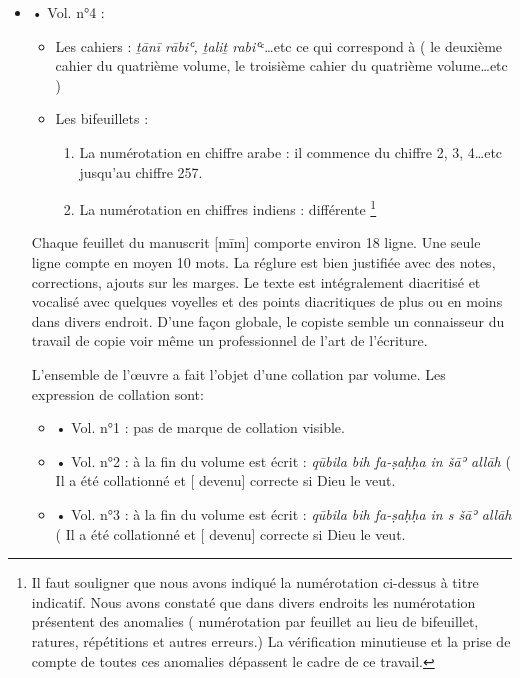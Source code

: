 \documentclass[a4paper,12pt]{report}
\begin{document}
\begin{itemize}
\begin{enumerate}
\begin{itemize}
\begin{itemize}
\begin{enumerate}
        \end{enumerate}
    
    \end{itemize}
    \item •	Vol. n°4 : 
    \begin{itemize}
        \item 	Les cahiers : \textit{ṯānī rābiʿ, ṯaliṯ rabiʿ}ᶜ…etc ce qui correspond à ( le deuxième cahier du quatrième volume, le troisième cahier du quatrième volume…etc ) 
        \item Les bifeuillets : 
         \begin{enumerate}
            \item La numérotation en chiffre arabe : il commence du chiffre 2, 3, 4…etc jusqu’au chiffre  257. 
            \item La numérotation en chiffres indiens : différente    \footnote{Il faut souligner que nous avons indiqué la numérotation ci-dessus à titre indicatif. Nous avons constaté que dans divers endroits les numérotation présentent des anomalies ( numérotation par feuillet au lieu de bifeuillet, ratures, répétitions et autres erreurs.) La vérification minutieuse et la prise de compte de toutes ces anomalies dépassent le cadre de ce travail.  }
     
        \end{enumerate}
    
    \end{itemize}
Chaque feuillet du manuscrit [mīm] comporte  environ 18 ligne. Une seule ligne compte en moyen 10 mots. La réglure  est  bien justifiée  avec des notes, corrections, ajouts  sur les marges.  
Le texte est intégralement diacritisé et vocalisé avec quelques voyelles et des points diacritiques de plus ou en moins dans divers endroit. D’une façon globale, le copiste semble un connaisseur du travail de copie voir même un professionnel de l’art de l’écriture. 

L’ensemble de l’œuvre a fait l’objet d’une collation par volume.  Les expression de collation sont:

\begin{itemize}
    \item •	Vol. n°1 : pas de marque de collation visible. 
    \item •	Vol. n°2 : à la fin du volume est écrit : \textit{qūbila bih fa-ṣaḥḥa in šāʾ allāh} ( Il a été collationné et [ devenu] correcte si Dieu le veut.
    \item •	Vol. n°3 : à la fin du volume est écrit : \textit{qūbila bih fa-ṣaḥḥa in s šāʾ allāh} ( Il a été collationné et [ devenu] correcte si Dieu le veut. 


\end{itemize}
\end{itemize}
\end{enumerate}
\end{itemize}
\end{document}
